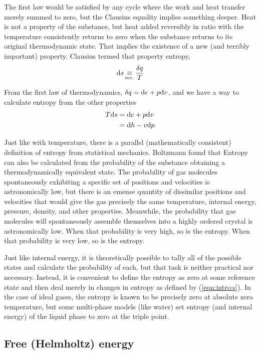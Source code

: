 The first law would be satisfied by any cycle where the work and heat transfer merely summed to zero, but the Clausius equality implies something deeper.  Heat is not a property of the substance, but heat added reversibly in ratio with the temperature consistently returns to zero when the substance returns to its original thermodynamic state.  That implies the existence of a new (and terribly important) property.  Clausius termed that property entropy,
\begin{align}
\mathrm{d} s \operatorname*{\equiv}_\mathrm{rev.} \frac{\delta q}{T}\label{eqn:intro:s}
\end{align}

From the first law of thermodynamics, $\delta q = \mathrm{d} e + p \mathrm{d} v$, and we have a way to calculate entropy from the other properties
\begin{align}
T \mathrm{d} s &= \mathrm{d} e + p\mathrm{d} v\label{eqn:intro:ds1}\\
 &= \mathrm{d} h - v \mathrm{d} p\label{eqn:intro:ds2}
\end{align}

Just like with temperature, there is a parallel (mathematically consistent) definition of entropy from statistical mechanics.  Boltzmann found that Entropy can also be calculated from the probability of the substance obtaining a thermodynamically equivalent state.  The probability of gas molecules spontaneously exhibiting a specific set of positions and velocities is astronomically low, but there is an emense quantity of dissimilar positions and velocities that would give the gas precisely the same temperature, internal energy, pressure, density, and other properties.  Meanwhile, the probability that gas molecules will spontaneously assemble themselves into a highly ordered crystal is astronomically low.  When that probability is very high, so is the entropy.  When that probability is very low, so is the entropy.

Just like internal energy, it is theoretically possible to tally all of the possible states and calculate the probability of each, but that task is neither practical nor necessary.  Instead, it is convenient to define the entropy as zero at some reference state and then deal merely in changes in entropy as defined by (\ref{eqn:intro:s}).  In the case of ideal gases, the entropy is known to be precisely zero at absolute zero temperature, but some multi-phase models (like water) set entropy (and internal energy) of the liquid phase to zero at the triple point.

\subsection{Free (Helmholtz) energy}

